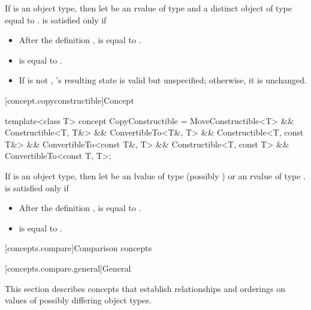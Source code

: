 \begin{itemdescr}
\pnum
If  is an object type, then let  be an rvalue of type
 and  a distinct object of type  equal to
.  is satisfied only if

\begin{itemize}
\item After the definition ,  is equal to .

\item {} is equal to .

\item If  is not , 's resulting state is valid
but unspecified; otherwise, it is unchanged.
\end{itemize}
\end{itemdescr}

[concept.copyconstructible]{Concept }

%
\begin{itemdecl}
template<class T>
  concept CopyConstructible =
    MoveConstructible<T> &&
    Constructible<T, T&> && ConvertibleTo<T&, T> &&
    Constructible<T, const T&> && ConvertibleTo<const T&, T> &&
    Constructible<T, const T> && ConvertibleTo<const T, T>;
\end{itemdecl}

\begin{itemdescr}
\pnum
If  is an object type, then let  be an lvalue of type
(possibly )  or an rvalue of type .
 is satisfied only if

\begin{itemize}
\item After the definition ,  is equal to .

\item {} is equal to .
\end{itemize}

\end{itemdescr}

[concepts.compare]{Comparison concepts}

[concepts.compare.general]{General}

\pnum
This section describes concepts that establish relationships and orderings
on values of possibly differing object types.

